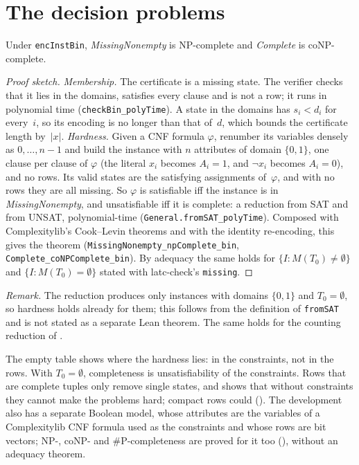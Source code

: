\documentclass[a4paper,UKenglish,cleveref,autoref,thm-restate]{lipics-v2021}
\begin{document}
\section{The decision problems}
\label{sec:decision}

\begin{theorem}
\label{thm:decision}
Under \lstinline{encInstBin}, \textit{MissingNonempty} is NP-complete and \textit{Complete} is
coNP-complete.
\end{theorem}

\begin{proof}[Proof sketch]
\emph{Membership.} The certificate is a missing state. The verifier checks that it lies in the
domains, satisfies every clause and is not a row; it runs in polynomial time
(\lstinline{checkBin_polyTime}). A state in the domains has $s_i < d_i$ for every~$i$, so its
encoding is no longer than that of~$d$, which bounds the certificate length by~$|x|$.
\emph{Hardness.} Given a CNF formula $\varphi$, renumber its variables densely as
$0, \dots, n-1$ and build the instance with $n$ attributes of domain $\{0,1\}$, one clause per
clause of $\varphi$ (the literal $x_i$ becomes $A_i = 1$, and $\lnot x_i$ becomes $A_i = 0$), and
no rows. Its valid states are the satisfying assignments of~$\varphi$, and with no rows they are
all missing. So $\varphi$ is satisfiable iff the instance is in \textit{MissingNonempty}, and
unsatisfiable iff it is complete: a reduction from SAT and from UNSAT, polynomial-time
(\lstinline{General.fromSAT_polyTime}). Composed with Complexitylib's Cook--Levin theorems and with the
identity re-encoding, this gives the theorem (\lstinline{MissingNonempty_npComplete_bin},
\lstinline{Complete_coNPComplete_bin}). By adequacy the same holds for
$\{I : M(T_0) \neq \emptyset\}$ and $\{I : M(T_0) = \emptyset\}$ stated with latc-check's
\lstinline{missing}.
\end{proof}

\emph{Remark.} The reduction produces only instances with domains $\{0,1\}$ and
$T_0 = \emptyset$, so hardness holds already for them; this follows from the definition of
\lstinline{fromSAT} and is not stated as a separate Lean theorem. The same holds for the counting
reduction of .

The empty table shows where the hardness lies: in the constraints, not in the rows. With
$T_0 = \emptyset$, completeness is unsatisfiability of the constraints. Rows that are complete
tuples only remove single states, and  shows that without constraints they
cannot make the problems hard; compact rows could (). The
development also has a separate Boolean model, whose attributes are the variables of a
Complexitylib CNF formula used as the constraints and whose rows are bit vectors; NP-, coNP- and
\#P-completeness are proved for it too (), without an adequacy theorem.
\end{document}
